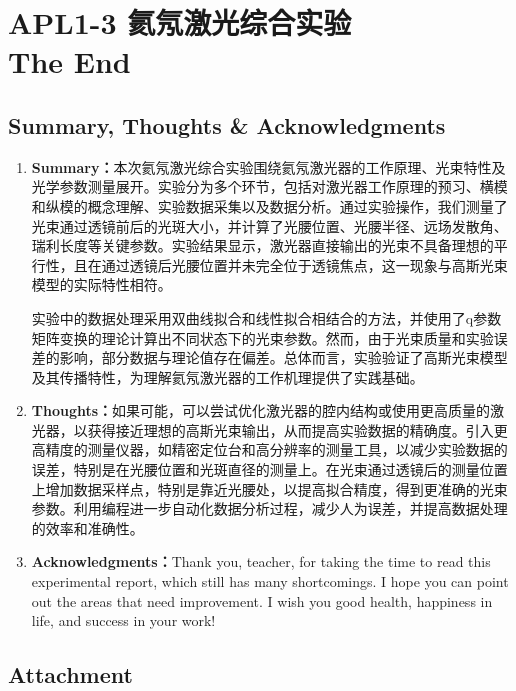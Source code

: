 
\section{APL1-3 氦氖激光综合实验 \\ The End}


\subsection{Summary, Thoughts \& Acknowledgments}
\begin{enumerate}
	\item \textbf{Summary：}本次氦氖激光综合实验围绕氦氖激光器的工作原理、光束特性及光学参数测量展开。实验分为多个环节，包括对激光器工作原理的预习、横模和纵模的概念理解、实验数据采集以及数据分析。通过实验操作，我们测量了光束通过透镜前后的光斑大小，并计算了光腰位置、光腰半径、远场发散角、瑞利长度等关键参数。实验结果显示，激光器直接输出的光束不具备理想的平行性，且在通过透镜后光腰位置并未完全位于透镜焦点，这一现象与高斯光束模型的实际特性相符。
	
	实验中的数据处理采用双曲线拟合和线性拟合相结合的方法，并使用了q参数矩阵变换的理论计算出不同状态下的光束参数。然而，由于光束质量和实验误差的影响，部分数据与理论值存在偏差。总体而言，实验验证了高斯光束模型及其传播特性，为理解氦氖激光器的工作机理提供了实践基础。
	
	\item \textbf{Thoughts：}如果可能，可以尝试优化激光器的腔内结构或使用更高质量的激光器，以获得接近理想的高斯光束输出，从而提高实验数据的精确度。引入更高精度的测量仪器，如精密定位台和高分辨率的测量工具，以减少实验数据的误差，特别是在光腰位置和光斑直径的测量上。在光束通过透镜后的测量位置上增加数据采样点，特别是靠近光腰处，以提高拟合精度，得到更准确的光束参数。利用编程进一步自动化数据分析过程，减少人为误差，并提高数据处理的效率和准确性。
	
	\item \textbf{Acknowledgments：}Thank you, teacher, for taking the time to read this experimental report, which still has many shortcomings. I hope you can point out the areas that need improvement. I wish you good health, happiness in life, and success in your work!
\end{enumerate}


\subsection{Attachment}

